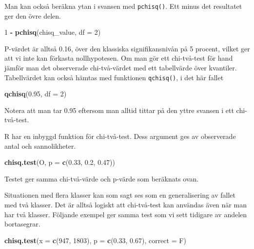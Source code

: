 \documentclass[
]{book}
\newenvironment{Shaded}{\begin{snugshade}}{\end{snugshade}}
\newcommand{\AttributeTok}[1]{\textcolor[rgb]{0.13,0.29,0.53}{#1}}
\newcommand{\DecValTok}[1]{\textcolor[rgb]{0.00,0.00,0.81}{#1}}
\newcommand{\FloatTok}[1]{\textcolor[rgb]{0.00,0.00,0.81}{#1}}
\newcommand{\FunctionTok}[1]{\textcolor[rgb]{0.13,0.29,0.53}{\textbf{#1}}}
\newcommand{\NormalTok}[1]{#1}
\newcommand{\SpecialCharTok}[1]{\textcolor[rgb]{0.81,0.36,0.00}{\textbf{#1}}}
\theoremstyle{definition}
\theoremstyle{definition}
\theoremstyle{definition}
\theoremstyle{definition}
\theoremstyle{remark}
\begin{document}
Man kan också beräkna ytan i svansen med \texttt{pchisq()}. Ett minus det resultatet ger den övre delen.

\begin{Shaded}
\begin{Highlighting}[]
\DecValTok{1} \SpecialCharTok{{-}} \FunctionTok{pchisq}\NormalTok{(chisq\_value, }\AttributeTok{df =} \DecValTok{2}\NormalTok{)}
\end{Highlighting}
\end{Shaded}

P-värdet är alltså 0.16, över den klassiska signifikansnivån på 5 procent, vilket ger att vi inte kan förkasta nollhypotesen. Om man gör ett chi-två-test för hand jämför man det observerade chi-två-värdet med ett tabellvärde över kvantiler. Tabellvärdet kan också hämtas med funktionen \texttt{qchisq()}, i det här fallet

\begin{Shaded}
\begin{Highlighting}[]
\FunctionTok{qchisq}\NormalTok{(}\FloatTok{0.95}\NormalTok{, }\AttributeTok{df =} \DecValTok{2}\NormalTok{)}
\end{Highlighting}
\end{Shaded}

Notera att man tar 0.95 eftersom man alltid tittar på den yttre svansen i ett chi-två-test.

R har en inbyggd funktion för chi-två-test. Dess argument ges av observerade antal och sannolikheter.

\begin{Shaded}
\begin{Highlighting}[]
\FunctionTok{chisq.test}\NormalTok{(O, }\AttributeTok{p =} \FunctionTok{c}\NormalTok{(}\FloatTok{0.33}\NormalTok{, }\FloatTok{0.2}\NormalTok{, }\FloatTok{0.47}\NormalTok{))}
\end{Highlighting}
\end{Shaded}

Testet ger samma chi-två-värde och p-värde som beräknats ovan.

Situationen med flera klasser kan som sagt ses som en generalisering av fallet med två klasser. Det är alltså logiskt att chi-två-test kan användas även när man har två klasser. Följande exempel ger samma test som vi sett tidigare av andelen bortasegrar.

\begin{Shaded}
\begin{Highlighting}[]
\FunctionTok{chisq.test}\NormalTok{(}\AttributeTok{x =} \FunctionTok{c}\NormalTok{(}\DecValTok{947}\NormalTok{, }\DecValTok{1803}\NormalTok{), }\AttributeTok{p =} \FunctionTok{c}\NormalTok{(}\FloatTok{0.33}\NormalTok{, }\FloatTok{0.67}\NormalTok{), }\AttributeTok{correct =}\NormalTok{ F)}
\end{Highlighting}
\end{Shaded}
\end{document}
